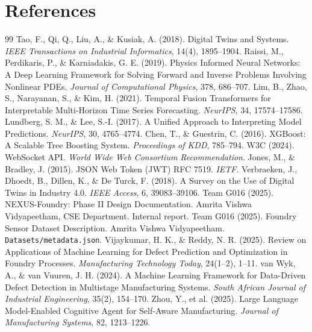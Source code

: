 \documentclass[11pt, a4paper]{article}
\begin{document}
\newpage
\section*{References}
\begin{thebibliography}{99}
     Tao, F., Qi, Q., Liu, A., \& Kusiak, A. (2018). Digital Twins and Systems. \emph{IEEE Transactions on Industrial Informatics}, 14(4), 1895--1904.
     Raissi, M., Perdikaris, P., \& Karniadakis, G. E. (2019). Physics Informed Neural Networks: A Deep Learning Framework for Solving Forward and Inverse Problems Involving Nonlinear PDEs. \emph{Journal of Computational Physics}, 378, 686--707.
     Lim, B., Zhao, S., Narayanan, S., \& Kim, H. (2021). Temporal Fusion Transformers for Interpretable Multi-Horizon Time Series Forecasting. \emph{NeurIPS}, 34, 17574--17586.
     Lundberg, S. M., \& Lee, S.-I. (2017). A Unified Approach to Interpreting Model Predictions. \emph{NeurIPS}, 30, 4765--4774.
     Chen, T., \& Guestrin, C. (2016). XGBoost: A Scalable Tree Boosting System. \emph{Proceedings of KDD}, 785--794.
     W3C (2024). WebSocket API. \emph{World Wide Web Consortium Recommendation}.
     Jones, M., \& Bradley, J. (2015). JSON Web Token (JWT) RFC 7519. \emph{IETF}.
     Verbraeken, J., Dhoedt, B., Dillen, K., \& De Turck, F. (2018). A Survey on the Use of Digital Twins in Industry 4.0. \emph{IEEE Access}, 6, 39083--39106.
     Team G016 (2025). NEXUS-Foundry: Phase II Design Documentation. Amrita Vishwa Vidyapeetham, CSE Department. Internal report.
     Team G016 (2025). Foundry Sensor Dataset Description. Amrita Vishwa Vidyapeetham. \texttt{Datasets/metadata.json}.
     Vijaykumar, H. K., \& Reddy, N. R. (2025). Review on Applications of Machine Learning for Defect Prediction and Optimization in Foundry Processes. \emph{Manufacturing Technology Today}, 24(1--2), 1--11.
     van Wyk, A., \& van Vuuren, J. H. (2024). A Machine Learning Framework for Data-Driven Defect Detection in Multistage Manufacturing Systems. \emph{South African Journal of Industrial Engineering}, 35(2), 154--170.
     Zhou, Y., et al. (2025). Large Language Model-Enabled Cognitive Agent for Self-Aware Manufacturing. \emph{Journal of Manufacturing Systems}, 82, 1213--1226.
\end{thebibliography}
\end{document}
